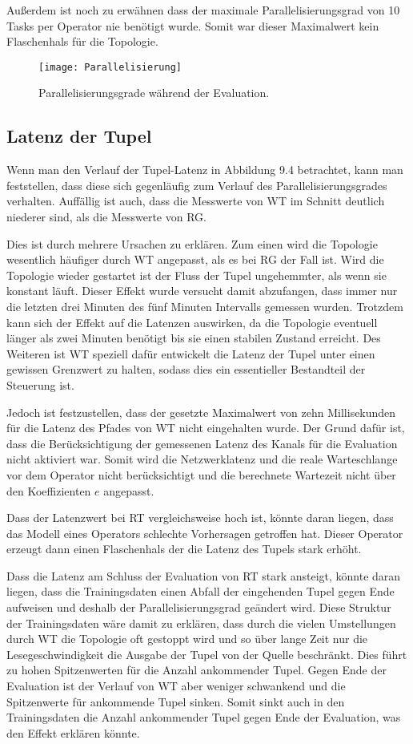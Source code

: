 Außerdem ist noch zu erwähnen dass der maximale Parallelisierungsgrad von 10 Tasks per Operator nie benötigt wurde.
Somit war dieser Maximalwert kein Flaschenhals für die Topologie.

\begin{figure}
\texttt{[image: Parallelisierung]}
\caption{Parallelisierungsgrade während der Evaluation.}
\end{figure}

\subsection{Latenz der Tupel}

Wenn man den Verlauf der Tupel-Latenz in Abbildung 9.4 betrachtet, kann man feststellen, dass diese sich gegenläufig zum Verlauf des Parallelisierungsgrades verhalten.
Auffällig ist auch, dass die Messwerte von WT im Schnitt deutlich niederer sind, als die Messwerte von RG.

Dies ist durch mehrere Ursachen zu erklären.
Zum einen wird die Topologie wesentlich häufiger durch WT angepasst, als es bei RG der Fall ist.
Wird die Topologie wieder gestartet ist der Fluss der Tupel ungehemmter, als wenn sie konstant läuft.
Dieser Effekt wurde versucht damit abzufangen, dass immer nur die letzten drei Minuten des fünf Minuten Intervalls gemessen wurden.
Trotzdem kann sich der Effekt auf die Latenzen auswirken, da die Topologie eventuell länger als zwei Minuten benötigt bis sie einen stabilen Zustand erreicht.
Des Weiteren ist WT speziell dafür entwickelt die Latenz der Tupel unter einen gewissen Grenzwert zu halten, sodass dies ein essentieller Bestandteil der Steuerung ist.

Jedoch ist festzustellen, dass der gesetzte Maximalwert von zehn Millisekunden für die Latenz des Pfades von WT nicht eingehalten wurde.
Der Grund dafür ist, dass die Berücksichtigung der gemessenen Latenz des Kanals für die Evaluation nicht aktiviert war.
Somit wird die Netzwerklatenz und die reale Warteschlange vor dem Operator nicht berücksichtigt und die berechnete Wartezeit nicht über den Koeffizienten \(e\) angepasst.

Dass der Latenzwert bei RT vergleichsweise hoch ist, könnte daran liegen, dass das Modell eines Operators schlechte Vorhersagen getroffen hat.
Dieser Operator erzeugt dann einen Flaschenhals der die Latenz des Tupels stark erhöht.

Dass die Latenz am Schluss der Evaluation von RT stark ansteigt, könnte daran liegen, dass die Trainingsdaten einen Abfall der eingehenden Tupel gegen Ende aufweisen und deshalb der Parallelisierungsgrad geändert wird.
Diese Struktur der Trainingsdaten wäre damit zu erklären, dass durch die vielen Umstellungen durch WT die Topologie oft gestoppt wird und so über lange Zeit nur die Lesegeschwindigkeit die Ausgabe der Tupel von der Quelle beschränkt.
Dies führt zu hohen Spitzenwerten für die Anzahl ankommender Tupel.
Gegen Ende der Evaluation ist der Verlauf von WT aber weniger schwankend und die Spitzenwerte für ankommende Tupel sinken.
Somit sinkt auch in den Trainingsdaten die Anzahl ankommender Tupel gegen Ende der Evaluation, was den Effekt erklären könnte.

